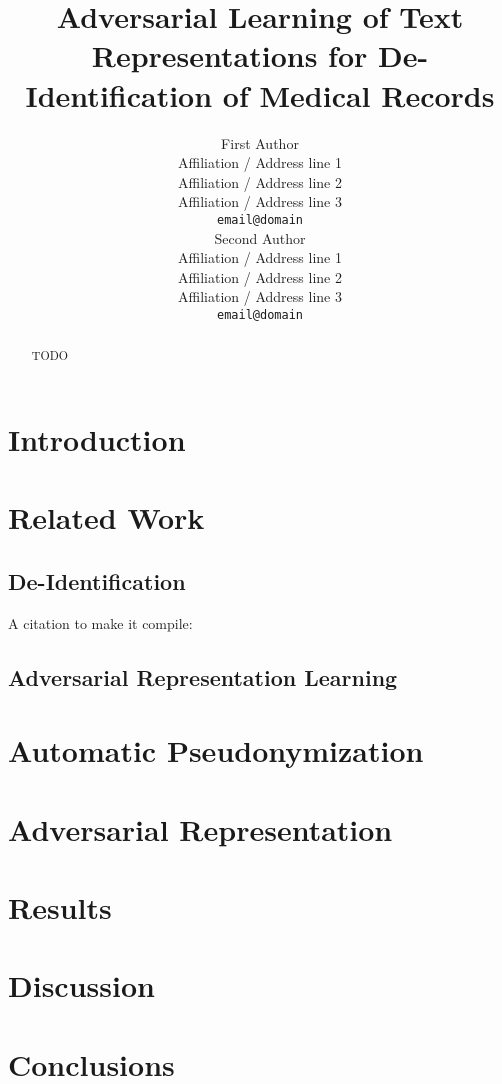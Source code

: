 \documentclass[11pt,a4paper]{article}
\title{Adversarial Learning of Text Representations for De-Identification of Medical Records}
\author{First Author \\
    Affiliation / Address line 1 \\
    Affiliation / Address line 2 \\
    Affiliation / Address line 3 \\
    {\tt email@domain} \\\And
    Second Author \\
    Affiliation / Address line 1 \\
    Affiliation / Address line 2 \\
    Affiliation / Address line 3 \\
    {\tt email@domain} \\}
\date{}
\begin{document}
\maketitle
\begin{abstract}
    TODO
\end{abstract}

\section{Introduction}

\section{Related Work}

\subsection{De-Identification}
%
A citation to make it compile: \citet{dernoncourt2017identification}

\subsection{Adversarial Representation Learning}

\section{Automatic Pseudonymization}

\section{Adversarial Representation}

\section{Results}

\section{Discussion}

\section{Conclusions}


%
%


\end{document}
